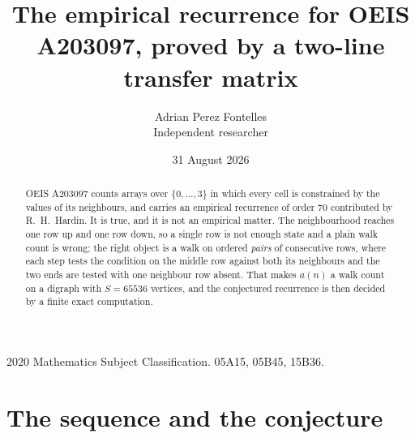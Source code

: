 \documentclass[11pt,a4paper]{article}
\title{The empirical recurrence for OEIS A203097, proved by a two-line transfer matrix}
\author{Adrian Perez Fontelles\\ \small Independent researcher}
\date{31 August 2026}
\theoremstyle{plain}
\theoremstyle{definition}
\begin{document}
\maketitle

\begin{abstract}
OEIS A203097 counts arrays over $\{0,\dots,3\}$ in which every cell is constrained by the
values of its neighbours, and carries an empirical recurrence of order $70$ contributed
by R.~H.~Hardin. It is true, and it is not an empirical matter. The neighbourhood reaches one
row up and one row down, so a single row is not enough state and a plain walk count
is wrong; the right object is a walk on ordered \emph{pairs} of consecutive rows, where
each step tests the condition on the middle row against both its neighbours and the two
ends are tested with one neighbour row absent. That makes $a(n)$ a walk count on a digraph
with $S=65536$ vertices, and the conjectured recurrence is then decided by a finite exact
computation.
\end{abstract}

\noindent\small 2020 Mathematics Subject Classification. 05A15, 05B45, 15B36.\normalsize

\section{The sequence and the conjecture}
\end{document}
